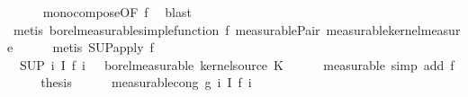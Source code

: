 \begin{isabellebody}
\ \ \ \ \isamarkupfalse%
\ mono{\isacharunderscore}{\kern0pt}compose{\isacharbrackleft}{\kern0pt}OF\ f{\isacharprime}{\kern0pt}{\isacharparenleft}{\kern0pt}{}{\isacharparenright}{\kern0pt}{\isacharbrackright}{\kern0pt}\ \isamarkupfalse%
\ blast\isanewline
\ \ \ \ \isamarkupfalse%
\ {\isacharparenleft}{\kern0pt}metis\ borel{\isacharunderscore}{\kern0pt}measurable{\isacharunderscore}{\kern0pt}simple{\isacharunderscore}{\kern0pt}function\ f{\isacharprime}{\kern0pt}{\isacharparenleft}{\kern0pt}{}{\isacharparenright}{\kern0pt}\ measurable{\isacharunderscore}{\kern0pt}Pair{}\ measurable{\isacharunderscore}{\kern0pt}kernel{\isacharunderscore}{\kern0pt}measure{\isacharparenright}{\kern0pt}\isanewline
\ \ \ \ \isamarkupfalse%
\ {\isacharparenleft}{\kern0pt}metis\ SUP{\isacharunderscore}{\kern0pt}apply\ f{\isacharprime}{\kern0pt}{\isacharparenleft}{\kern0pt}{}{\isacharparenright}{\kern0pt}{\isacharparenright}{\kern0pt}\isanewline
\ \ \ \ \isamarkupfalse%
\isanewline
\ \ \isamarkupfalse%
\ \isamarkupfalse%
\ {\isachardoublequoteopen}{\isacharparenleft}{\kern0pt}{\isasymlambda}{\isasymomega}\ {\isacharparenleft}{\kern0pt}SUP\ i{\isachardot}{\kern0pt}\ I\ {\isacharparenleft}{\kern0pt}f{\isacharprime}{\kern0pt}\ i{\isacharparenright}{\kern0pt}\ {\isasymomega}\ {\isasymin}\ borel{\isacharunderscore}{\kern0pt}measurable\ {\isacharparenleft}{\kern0pt}kernel{\isacharunderscore}{\kern0pt}source\ K{\isacharparenright}{\kern0pt}{\isachardoublequoteclose}\isanewline
\ \ \ \ \isamarkupfalse%
\ {\isacharparenleft}{\kern0pt}measurable{\isacharcomma}{\kern0pt}\ simp\ add{\isacharcolon}{\kern0pt}\ f{\isacharprime}{\kern0pt}{\isacharparenleft}{\kern0pt}{}{\isacharcomma}{\kern0pt}\ {}{\isacharparenright}{\kern0pt}{\isacharparenright}{\kern0pt}\isanewline
\ \ \isamarkupfalse%
\ \isamarkupfalse%
\ {\isacharquery}{\kern0pt}thesis\isanewline
\ \ \ \ \isamarkupfalse%
\ measurable{\isacharunderscore}{\kern0pt}cong{\isacharbrackleft}{\kern0pt}\ g{\isacharequal}{\kern0pt}{\isachardoublequoteopen}{\isasymlambda}{\isasymomega}{\isachardot}{\kern0pt}\ {\isacharparenleft}{\kern0pt}{\isasymSqunion}i{\isachardot}{\kern0pt}\ I\ {\isacharparenleft}{\kern0pt}f{\isacharprime}{\kern0pt}\ i{\isacharparenright}{\kern0pt}\ {\isasymomega}{\isacharparenright}{\kern0pt}{\isachardoublequoteclose}{\isacharbrackright}{\kern0pt}\ \isamarkupfalse%

\end{isabellebody}
